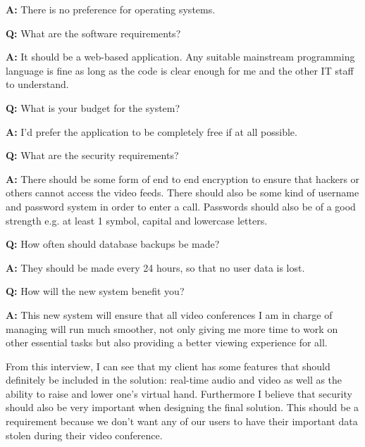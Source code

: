 \begin{tcolorbox}[
  boxrule=0pt, frame empty, colback=lightestgray, arc=0pt,
  breakable, colframe=white
]
  \textbf{A:} There is no preference for operating systems.
  \vspace{0.25cm}

  \textbf{Q:} What are the software requirements? 
  \vspace{0.05cm}

  \textbf{A:} It should be a web-based application. Any 
  suitable mainstream programming language is fine as long as 
  the code is clear enough for me and the other IT staff to 
  understand.
  \vspace{0.25cm}

  \textbf{Q:} What is your budget for the system?
  \vspace{0.05cm}

  \textbf{A:} I'd prefer the application to be completely free
  if at all possible. \vspace{0.25cm}

  \textbf{Q:} What are the security requirements?
  \vspace{0.05cm}

  \textbf{A:} There should be some form of end to end 
  encryption to ensure that hackers or others cannot access the
  video feeds. There should also be some kind of username and 
  password system in order to enter a call. Passwords should 
  also be of a good strength e.g. at least 1 symbol, capital
  and lowercase letters.
  \vspace{0.25cm}

  \textbf{Q:} How often should database backups be made?
  \vspace{0.05cm}

  \textbf{A:} They should be made every 24 hours, so that no 
  user data is lost.
  \vspace{0.25cm}


  \textbf{Q:} How will the new system benefit you? 
  \vspace{0.05cm}

  \textbf{A:} This new system will ensure that all video 
  conferences I am in charge of managing will run much 
  smoother, not only giving me more time to work on other 
  essential tasks but also providing a better viewing
  experience for all.

\end{tcolorbox}

From this interview, I can see that my client has some features
that should definitely be included in the solution: real-time 
audio and video as well as the ability to raise and lower one's
virtual hand. Furthermore I believe that security should also 
be very important when designing the final solution. This 
should be a requirement because we don't want any of our users
to have their important data stolen during their video
conference. \vspace{0.2cm}


